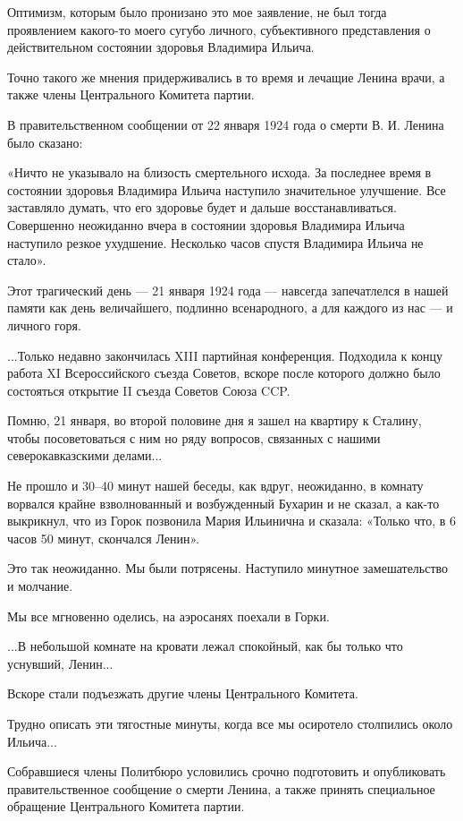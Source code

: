 \documentclass[12pt, a4paper, openany]{book}
\begin{document}
Оптимизм, которым было пронизано это мое заявление, не был тогда проявлением какого-то моего сугубо личного, субъективного представления о действительном состоянии здоровья Владимира Ильича.

Точно такого же мнения придерживались в то время и лечащие Ленина врачи, а также члены Центрального Комитета партии.

В правительственном сообщении от 22 января 1924 года о смерти В. И. Ленина было сказано:

«Ничто не указывало на близость смертельного исхода. За последнее время в состоянии здоровья Владимира Ильича наступило значительное улучшение. Все заставляло думать, что его здоровье будет и дальше восстанавливаться. Совершенно неожиданно вчера в состоянии здоровья Владимира Ильича наступило резкое ухудшение. Несколько часов спустя Владимира Ильича не стало».

Этот трагический день — 21 января 1924 года — навсегда запечатлелся в нашей памяти как день величайшего, подлинно всенародного, а для каждого из нас — и личного горя.

...Только недавно закончилась XIII партийная конференция. Подходила к концу работа XI Всероссийского съезда Советов, вскоре после которого должно было состояться открытие II съезда Советов Союза CCP.

Помню, 21 января, во второй половине дня я зашел на квартиру к Сталину, чтобы посоветоваться с ним но ряду вопросов, связанных с нашими северокавказскими делами...

Не прошло и 30–40 минут нашей беседы, как вдруг, неожиданно, в комнату ворвался крайне взволнованный и возбужденный Бухарин и не сказал, а как-то выкрикнул, что из Горок позвонила Мария Ильинична и сказала: «Только что, в 6 часов 50 минут, скончался Ленин».

Это так неожиданно. Мы были потрясены. Наступило минутное замешательство и молчание.

Мы все мгновенно оделись, на аэросанях поехали в Горки.

...В небольшой комнате на кровати лежал спокойный, как бы только что уснувший, Ленин...

Вскоре стали подъезжать другие члены Центрального Комитета.

Трудно описать эти тягостные минуты, когда все мы осиротело столпились около Ильича...

Собравшиеся члены Политбюро условились срочно подготовить и опубликовать правительственное сообщение о смерти Ленина, а также принять специальное обращение Центрального Комитета партии.
\end{document}
